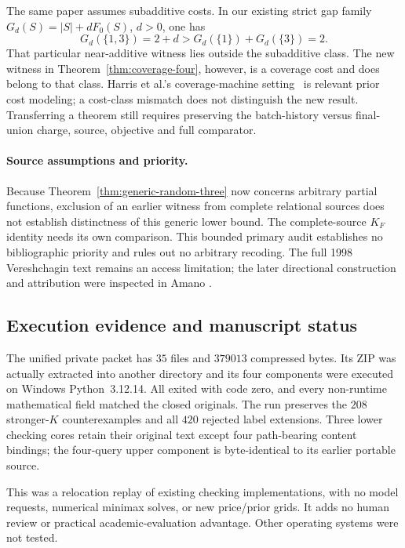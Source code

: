 \documentclass[pdflatex,sn-mathphys-num]{sn-jnl}
\theoremstyle{thmstyleone}
\theoremstyle{thmstylethree}
\theoremstyle{thmstyletwo}
\begin{document}
The same paper assumes subadditive costs. In our existing strict gap
family $G_d(S)=|S|+dF_0(S)$, $d>0$, one has
\[
 G_d(\{1,3\})=2+d>
 G_d(\{1\})+G_d(\{3\})=2.
\]
That particular near-additive witness lies outside the subadditive
class. The new witness in Theorem~\ref{thm:coverage-four}, however, is a
coverage cost and does belong to that class. Harris et al.'s
coverage-machine setting~\cite[Section~4]{harris2025} is relevant prior
cost modeling; a cost-class mismatch does not distinguish the new result.
Transferring a theorem still requires preserving the batch-history versus
final-union charge, source, objective and full comparator.

\paragraph*{Source assumptions and priority.}
Because Theorem~\ref{thm:generic-random-three} now concerns arbitrary
partial functions, exclusion of an earlier witness from complete
relational sources does not establish distinctness of this generic
lower bound. The complete-source $K_F$ identity needs its own comparison.
This bounded primary audit establishes no bibliographic priority and
rules out no arbitrary recoding. The full 1998 Vereshchagin text remains
an access limitation; the later directional construction and attribution
were inspected in Amano \cite{amano2011directional}.

\subsection{Execution evidence and manuscript status}
\label{sec:generic-execution}
The unified private packet has $35$ files and $379013$ compressed bytes.
Its ZIP was actually extracted into another directory and its four
components were executed on Windows Python~3.12.14. All exited with
code zero, and every non-runtime mathematical field matched the closed
originals. The run preserves the $208$ stronger-$K$ counterexamples and
all $420$ rejected label extensions. Three lower checking cores retain
their original text except four path-bearing content bindings; the
four-query upper component is byte-identical to its earlier portable
source.

This was a relocation replay of existing checking implementations,
with no model requests, numerical minimax solves, or new price/prior
grids. It adds no human review or practical academic-evaluation advantage.
Other operating systems were not tested.
\end{document}
